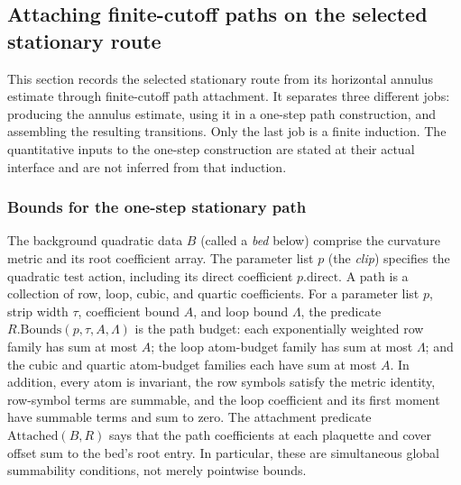 \subsection{Attaching finite-cutoff paths on the selected stationary route}
\label{sec:path-attachment-producer}

This section records the selected stationary route from its horizontal
annulus estimate through finite-cutoff path attachment. It separates three
different jobs: producing the annulus estimate, using it in a one-step path
construction, and assembling the resulting transitions. Only the last job
is a finite induction. The quantitative inputs to the one-step construction
are stated at their actual interface and are not inferred from that
induction.

\subsubsection{Bounds for the one-step stationary path}

The background quadratic data $B$ (called a \emph{bed} below) comprise
the curvature metric and its root coefficient array. The parameter list
$p$ (the \emph{clip}) specifies the quadratic test action, including its
direct coefficient $p.\mathrm{direct}$. A path is a collection of row, loop, cubic, and quartic coefficients. For a
parameter list $p$, strip width $\tau$, coefficient bound $A$, and loop bound $\Lambda$, the
predicate $R.\mathrm{Bounds}(p,\tau,A,\Lambda)$ is the path budget:
each exponentially weighted row family has sum at most $A$; the loop
atom-budget family has sum at most $\Lambda$; and the cubic and quartic
atom-budget families each have sum at most $A$. In addition, every atom is
invariant, the row symbols satisfy the metric identity, row-symbol terms are
summable, and the loop coefficient and its first moment have summable terms
and sum to zero. The attachment predicate $\mathrm{Attached}(B,R)$ says
that the path coefficients at each plaquette and cover offset sum to the
bed's root entry. In particular, these are simultaneous global summability
conditions, not merely pointwise bounds.

